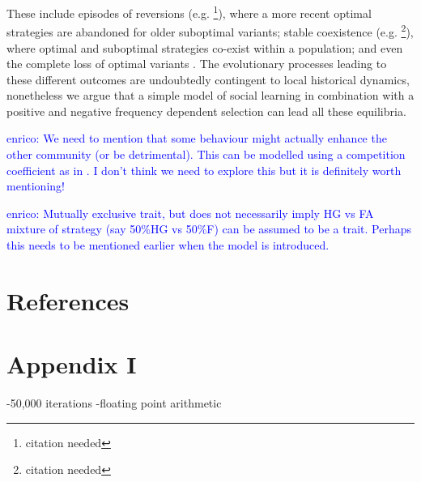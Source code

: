 \documentclass[preprint,authoryear]{elsarticle}
\newcommand{\memo}[2]{\textcolor{#1}{#2}}
\newcommand{\enrico}[1]{\memo{blue}{enrico: #1\\}}
\begin{document}
These include episodes of reversions (e.g. \footnote{citation needed}), where a more recent optimal strategies are abandoned for older suboptimal variants; stable coexistence (e.g. \footnote{citation needed}), where optimal and suboptimal strategies co-exist within a population; and even the complete loss of optimal variants \citep[e.g.][]{henrich2004}. The evolutionary processes leading to these different outcomes are undoubtedly contingent to local historical dynamics, nonetheless we argue that a simple model of social learning in combination with a positive and negative frequency dependent selection can lead all these equilibria.


\enrico{We need to mention that some behaviour might actually enhance the other community (or be detrimental). This can be modelled using a competition coefficient as in \citep{jang2013}. I don't think we need to explore this but it is definitely worth mentioning!}

\enrico{Mutually exclusive trait, but does not necessarily imply HG vs FA mixture of strategy (say 50\%HG vs 50\%F) can be assumed to be a trait. Perhaps this needs to be mentioned earlier when the model is introduced.}


\section{References}




\section{Appendix I}

-50,000 iterations
-floating point arithmetic
\end{document}
